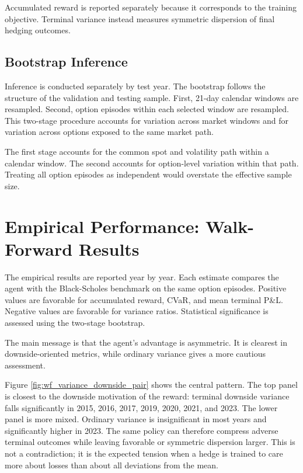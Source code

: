 \documentclass[a4paper,12pt]{article}
\numberwithin{equation}{section}
\begin{document}
Accumulated reward is reported separately because it corresponds to the training objective. Terminal variance instead measures symmetric dispersion of final hedging outcomes.

\subsection{Bootstrap Inference}

Inference is conducted separately by test year. The bootstrap follows the structure of the validation and testing sample. First, 21-day calendar windows are resampled. Second, option episodes within each selected window are resampled. This two-stage procedure accounts for variation across market windows and for variation across options exposed to the same market path.

The first stage accounts for the common spot and volatility path within a calendar window. The second accounts for option-level variation within that path. Treating all option episodes as independent would overstate the effective sample size.

\section{Empirical Performance: Walk-Forward Results}

The empirical results are reported year by year. Each estimate compares the agent with the Black-Scholes benchmark on the same option episodes. Positive values are favorable for accumulated reward, CVaR, and mean terminal P\&L. Negative values are favorable for variance ratios. Statistical significance is assessed using the two-stage bootstrap.

The main message is that the agent's advantage is asymmetric. It is clearest in downside-oriented metrics, while ordinary variance gives a more cautious assessment.

Figure \ref{fig:wf_variance_downside_pair} shows the central pattern. The top panel is closest to the downside motivation of the reward: terminal downside variance falls significantly in 2015, 2016, 2017, 2019, 2020, 2021, and 2023. The lower panel is more mixed. Ordinary variance is insignificant in most years and significantly higher in 2023. The same policy can therefore compress adverse terminal outcomes while leaving favorable or symmetric dispersion larger. This is not a contradiction; it is the expected tension when a hedge is trained to care more about losses than about all deviations from the mean.
\end{document}
